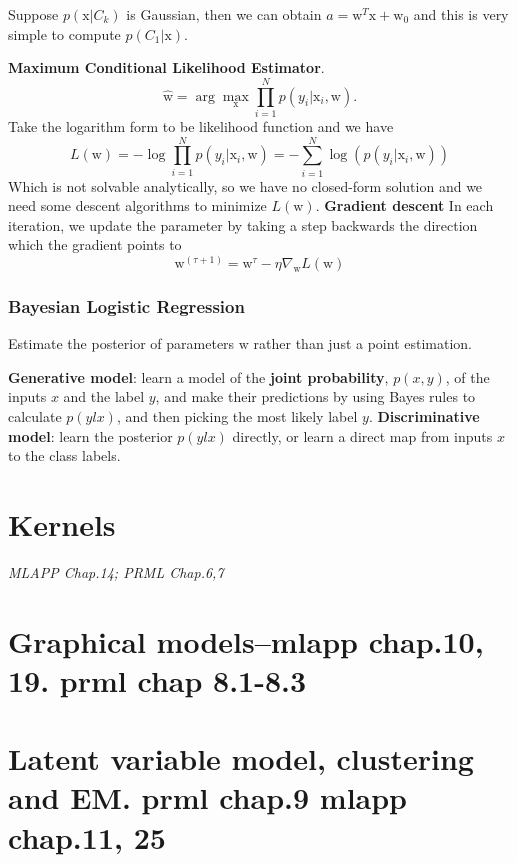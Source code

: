 \documentclass{article}
\newcommand{\mrm}{\mathrm}
\begin{document}
Suppose $p(\mrm x|C_k)$ is  Gaussian, then we can obtain $a = \mrm w^T\mrm x+\mrm w_0$ and this is very simple to compute $p(C_1|\mrm x)$.

\textbf{Maximum Conditional Likelihood Estimator}.\newline
\begin{equation}
    \hat{\mrm w} = \arg\max_{\mrm x}\prod_{i=1}^{N}p(y_i|\mrm x_i,\mrm w).
\end{equation}
Take the logarithm form to be likelihood function and we have 
\begin{equation}
    L(\mrm w) = -\log\prod_{i=1}^{N}p(y_i|\mrm x_i,\mrm w)=-\sum_{i=1}^{N}\log(p(y_i|\mrm x_i,\mrm w))
\end{equation}
Which is not solvable analytically, so we have no closed-form solution and we need some descent algorithms to minimize $L(\mrm w)$.
\textbf{Gradient descent}
In each iteration, we update the parameter by taking a step backwards the direction which the gradient points to
\begin{equation}
    \mrm w^{(\tau+1)} = \mrm w^{\tau}-\eta \nabla_{\mrm w}L(\mrm w)
\end{equation}

\subsubsection*{Bayesian Logistic Regression}
Estimate the posterior of parameters $\mrm w$ rather than just a point estimation.

\textbf{Generative model}: learn a model of the \textbf{joint probability}, $p(x, y)$, of the inputs $x$ and the label $y$, and make their predictions by using Bayes rules to calculate $p(ylx)$, and then picking the most likely label $y$.\newline
\textbf{Discriminative model}: learn the posterior $p(ylx)$ directly, or learn a direct map from inputs $x$ to the class labels.
\section{Kernels}
\emph{MLAPP Chap.14; PRML Chap.6,7}

\section{Graphical models--mlapp chap.10, 19. prml chap 8.1-8.3}

\section{Latent variable model, clustering and EM. prml chap.9 mlapp chap.11, 25}
\end{document}

